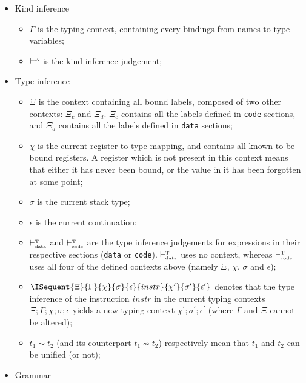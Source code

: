 \begin{itemize}
	\item Kind inference
	      \begin{itemize}
		      \item $\Gamma$ is the typing context, containing every bindings from names to type variables;
		      \item $\vdash^{\text{\tiny K}}$ is the kind inference judgement;
	      \end{itemize}
	\item Type inference
	      \begin{itemize}
		      \item $\Xi$ is the context containing all bound labels, composed of two other contexts: $\Xi_{c}$ and $\Xi_{d}$. $\Xi_{c}$ contains all the labels defined in \texttt{code} sections, and $\Xi_{d}$ contains all the labels defined in \texttt{data} sections;
		      \item $\chi$ is the current register-to-type mapping, and contains all known-to-be-bound registers.
		            A register which is not present in this context means that either it has never been bound, or the value in it has been forgotten at some point;
		      \item $\sigma$ is the current stack type;
		      \item $\epsilon$ is the current continuation;
		      \item $\vdash^{\text{\tiny T}}_{\text{\tiny data}}$ and $\vdash^{\text{\tiny T}}_{\text{\tiny code}}$ are the type inference judgements for expressions in their respective sections (\texttt{data} or \texttt{code}).
		            $\vdash^{\text{\tiny T}}_{\text{\tiny data}}$ uses no context, whereas $\vdash^{\text{\tiny T}}_{\text{\tiny code}}$ uses all four of the defined contexts above (namely $\Xi$, $\chi$, $\sigma$ and $\epsilon$);
		      \item $\ISequent{\Xi}{\Gamma}{\chi}{\sigma}{\epsilon}{instr}{\chi^\prime}{\sigma^\prime}{\epsilon^\prime}$ denotes that the type inference of the instruction $instr$ in the current typing contexts $\Xi;\Gamma;\chi;\sigma;\epsilon$ yields a new typing context $\chi^\prime;\sigma^\prime;\epsilon^\prime$ (where $\Gamma$ and $\Xi$ cannot be altered);
		      \item $t_1 \sim t_2$ (and its counterpart $t_1 \nsim t_2$) respectively mean that $t_1$ and $t_2$ can be unified (or not);
	      \end{itemize}
	\item Grammar
	      \begin{figure}[H]

\end{figure}
\end{itemize}
